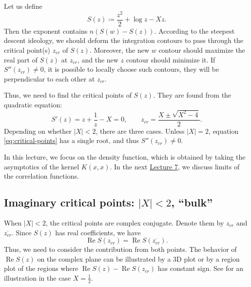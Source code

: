 \documentclass[letterpaper,11pt,oneside,reqno]{article}
\numberwithin{equation}{section}
\theoremstyle{definition}
\begin{document}
Let us define
\begin{equation*}
	S(z)\coloneqq
	\frac{z^2}{2}+\log z -X z.
\end{equation*}
Then the exponent contains $n \left( S(w)-S(z) \right)$.
According to the steepest descent ideology, we
should deform the integration contours
to pass through the critical point(s) $z_{cr}$ of $S(z)$.
Moreover, the new $w$ contour should maximize the real part of $S(z)$
at $z_{cr}$, and the new $z$ contour should minimize it.
If $S''(z_{cr})\ne 0$, it is possible to locally choose such contours,
they will be perpendicular to each other at $z_{cr}$.

Thus, we need to find the critical points of $S(z)$.
They are found from the quadratic equation:
\begin{equation}
	\label{eq:critical-points}
	S'(z)=z+\frac{1}{z}-X=0,\qquad
	z_{cr}=\frac{X\pm \sqrt{X^2-4}}{2}.
\end{equation}
Depending on whether $|X|<2$, there are three cases.
Unless $|X|=2$, equation \eqref{eq:critical-points} has a single root, and
thus $S''(z_{cr})\ne 0$.

In this lecture, we focus on the density function, which is obtained by taking the asymptotics of the
kernel $K(x,x)$. In the next \href{https://lpetrov.cc/rmt25/rmt25-notes/rmt2025-l07.pdf}{Lecture 7},
we discuss limits of the correlation functions.

\subsection{Imaginary critical points: $|X|<2$, ``bulk''}
\label{sub:imaginary-critical-points}

When $|X|<2$, the critical points are complex conjugate.
Denote them by $z_{cr}$ and $\overline{z_{cr}}$.
Since $S(z)$ has real coefficients, we have
\begin{equation*}
	\operatorname{Re}S(z_{cr})=\operatorname{Re}S(\overline{z_{cr}}).
\end{equation*}
Thus, we need to consider the contribution from both points.
The behavior of $\operatorname{Re}S(z)$ on the complex plane
can be illustrated by a 3D plot or by a region plot of the regions
where $\operatorname{Re}S(z)-\operatorname{Re}S(z_{cr})$ has constant sign.
See  for an illustration in the case $X=\frac{1}{2}$.
\end{document}
